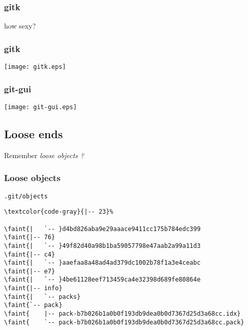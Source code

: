 \documentclass[english]{beamer}
\newcommand{\mysubsection}[2]{%
  \hypertarget{#2}{}%
  \subsection{#1}%
  \label{#2}%
}
\newcommand{\CMD}[1]{%
\texttt{\textcolor{code-green}{#1}}%
}
\newcommand{\faint}[1]{%
\textcolor{code-gray}{#1}%
}
\begin{document}
\begin{frame}
\frametitle{gitk}
\begin{center}
        how sexy?
\end{center}
\end{frame}

\begin{frame}[fragile]
\frametitle{gitk}

\begin{center}
\texttt{[image: gitk.eps]}
\end{center}

\end{frame}

\begin{frame}[fragile]
\frametitle{git-gui}

\begin{center}
\texttt{[image: git-gui.eps]}
\end{center}

\end{frame}

\mysubsection{Loose ends}{using:loose}
\begin{frame}
\begin{center}
        Remember \em{loose objects} ?
\end{center}
\end{frame}

\begin{frame}[fragile]
\frametitle{Loose objects}
\CMD{.git/objects}
{\small
\begin{Verbatim}[commandchars=\\\{\}]
\faint{|-- 23}
\faint{|   `-- }d4bd826aba9e29aaace9411cc175b784edc399
\faint{|-- 76}
\faint{|   `-- }49f82d40a98b1ba59057798e47aab2a99a11d3
\faint{|-- c4}
\faint{|   `-- }aaefaa8a48ad4ad379dc1002b78f1a3e4ceabc
\faint{|-- e7}
\faint{|   `-- }4be61128eef713459ca4e32398d689fe80864e
\faint{|-- info}
\faint{|   `-- packs}
\faint{`-- pack}
\faint{    |-- pack-b7b026b1a0b0f193db9dea0b0d7367d25d3a68cc.idx}
\faint{    `-- pack-b7b026b1a0b0f193db9dea0b0d7367d25d3a68cc.pack}
\end{Verbatim}
}
\vspace{\textheight}
\end{frame}
\end{document}
